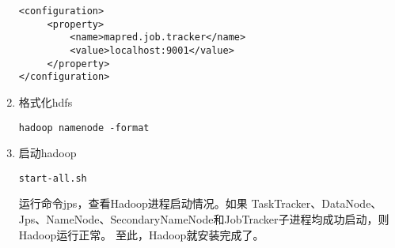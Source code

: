 \begin{enumerate}
\begin{verbatim}
<configuration>
     <property>
         <name>mapred.job.tracker</name>
         <value>localhost:9001</value>
     </property>
</configuration>
\end{verbatim}
\item 格式化hdfs

\begin{verbatim}
hadoop namenode -format
\end{verbatim}
\item 启动hadoop

\begin{verbatim}
start-all.sh
\end{verbatim}
运行命令jps，查看Hadoop进程启动情况。如果
TaskTracker、DataNode、Jps、NameNode、SecondaryNameNode和JobTracker子进程均成功启动，则Hadoop运行正常。
至此，Hadoop就安装完成了。
\end{enumerate}